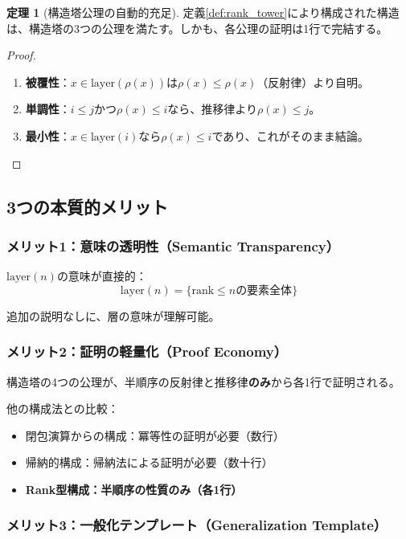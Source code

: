 \documentclass[a4paper,12pt]{ltjsarticle}
\theoremstyle{definition}
\newtheorem{theorem}[definition]{定理}
\begin{document}
\begin{theorem}[構造塔公理の自動的充足]
定義\ref{def:rank_tower}により構成された構造は、構造塔の3つの公理を満たす。しかも、各公理の証明は1行で完結する。
\end{theorem}

\begin{proof}
\begin{enumerate}
\item \textbf{被覆性}：$x \in \text{layer}(\rho(x))$は$\rho(x) \leq \rho(x)$（反射律）より自明。

\item \textbf{単調性}：$i \leq j$かつ$\rho(x) \leq i$なら、推移律より$\rho(x) \leq j$。

\item \textbf{最小性}：$x \in \text{layer}(i)$なら$\rho(x) \leq i$であり、これがそのまま結論。
\end{enumerate}
\end{proof}

\subsection{3つの本質的メリット}

\subsubsection{メリット1：意味の透明性（Semantic Transparency）}

$\text{layer}(n)$の意味が直接的：
$$\text{layer}(n) = \{\text{rank} \leq n \text{の要素全体}\}$$

追加の説明なしに、層の意味が理解可能。

\subsubsection{メリット2：証明の軽量化（Proof Economy）}

構造塔の4つの公理が、半順序の反射律と推移律\textbf{のみ}から各1行で証明される。

他の構成法との比較：
\begin{itemize}
\item 閉包演算からの構成：冪等性の証明が必要（数行）
\item 帰納的構成：帰納法による証明が必要（数十行）
\item \textbf{Rank型構成：半順序の性質のみ（各1行）}
\end{itemize}

\subsubsection{メリット3：一般化テンプレート（Generalization Template）}
\end{document}
